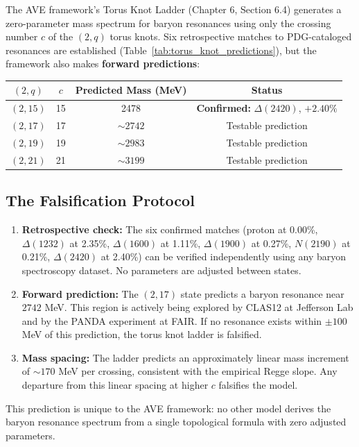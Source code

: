 The AVE framework's Torus Knot Ladder (Chapter 6, Section 6.4) generates a zero-parameter mass spectrum for baryon resonances using only the crossing number $c$ of the $(2,q)$ torus knots. Six retrospective matches to PDG-cataloged resonances are established (Table~\ref{tab:torus_knot_predictions}), but the framework also makes \textbf{forward predictions}:

\begin{center}
\begin{tabular}{|c|c|c|c|}
\hline
$(2,q)$ & $c$ & Predicted Mass (MeV) & Status \\ \hline
$(2,15)$ & 15 & 2478 & \textbf{Confirmed:} $\Delta(2420)$, $+2.40\%$ \\
$(2,17)$ & 17 & $\sim 2742$ & Testable prediction \\
$(2,19)$ & 19 & $\sim 2983$ & Testable prediction \\
$(2,21)$ & 21 & $\sim 3199$ & Testable prediction \\ \hline
\end{tabular}
\label{tab:torus_knot_predictions}
\end{center}

\subsection{The Falsification Protocol}
\begin{enumerate}
    \item \textbf{Retrospective check:} The six confirmed matches (proton at 0.00\%, $\Delta(1232)$ at 2.35\%, $\Delta(1600)$ at 1.11\%, $\Delta(1900)$ at 0.27\%, $N(2190)$ at 0.21\%, $\Delta(2420)$ at 2.40\%) can be verified independently using any baryon spectroscopy dataset. No parameters are adjusted between states.
    \item \textbf{Forward prediction:} The $(2,17)$ state predicts a baryon resonance near $2742$ MeV. This region is actively being explored by CLAS12 at Jefferson Lab and by the PANDA experiment at FAIR. If no resonance exists within $\pm 100$ MeV of this prediction, the torus knot ladder is falsified.
    \item \textbf{Mass spacing:} The ladder predicts an approximately linear mass increment of $\sim 170$ MeV per crossing, consistent with the empirical Regge slope. Any departure from this linear spacing at higher $c$ falsifies the model.
\end{enumerate}

This prediction is unique to the AVE framework: no other model derives the baryon resonance spectrum from a single topological formula with zero adjusted parameters.